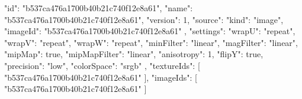 {
  "id": "b537ca476a1700b40b21c740f12e8a61",
  "name": "b537ca476a1700b40b21c740f12e8a61",
  "version": 1,
  "source": {
    "kind": "image",
    "imageId": "b537ca476a1700b40b21c740f12e8a61"
  },
  "settings": {
    "wrapU": "repeat",
    "wrapV": "repeat",
    "wrapW": "repeat",
    "minFilter": "linear",
    "magFilter": "linear",
    "mipMap": true,
    "mipMapFilter": "linear",
    "anisotropy": 1,
    "flipY": true,
    "precision": "low",
    "colorSpace": "srgb"
  },
  "textureIds": [
    "b537ca476a1700b40b21c740f12e8a61"
  ],
  "imageIds": [
    "b537ca476a1700b40b21c740f12e8a61"
  ]
}

